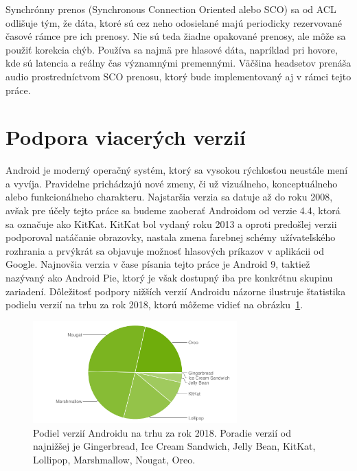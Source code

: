 Synchrónny prenos (Synchronous Connection Oriented alebo SCO) sa od ACL odlišuje tým, že dáta, ktoré sú cez neho odosielané majú periodicky rezervované časové rámce pre ich prenosy. Nie sú teda žiadne opakované prenosy, ale môže sa použiť korekcia chýb. Používa sa najmä pre hlasové dáta, napríklad pri hovore, kde sú latencia a reálny čas významnými premennými. Väčšina headsetov prenáša audio prostredníctvom SCO prenosu, ktorý bude implementovaný aj v rámci tejto práce.



\section{Podpora viacerých verzií}

Android je moderný operačný systém, ktorý sa vysokou rýchlosťou neustále mení a vyvíja. Pravidelne prichádzajú nové zmeny, či už vizuálneho, konceptuálneho alebo funkcionálneho charakteru. Najstaršia verzia sa datuje až do roku 2008, avšak pre účely tejto práce sa budeme zaoberať Androidom od verzie 4.4, ktorá sa označuje ako KitKat. KitKat bol vydaný roku 2013 a oproti predošlej verzii podporoval natáčanie obrazovky, nastala zmena farebnej schémy užívateľského rozhrania a prvýkrát sa objavuje možnosť hlasových príkazov v aplikácii od Google. Najnovšia verzia v čase písania tejto práce je Android 9, taktiež nazývaný ako Android Pie, ktorý je však dostupný iba pre konkrétnu skupinu zariadení. Dôležitosť podpory nižších verzií Androidu názorne ilustruje štatistika podielu verzií na trhu za rok 2018, ktorú môžeme vidieť na obrázku~\ref{market-share}.

\begin{figure}[hbt]
	\centering
	\includegraphics[width=0.7\textwidth]{obrazky-figures/market-share.png}
	\caption{Podiel verzií Androidu na trhu za rok 2018\protect\footnotemark. Poradie verzií od najnižšej je Gingerbread, Ice Cream Sandwich, Jelly Bean, KitKat, Lollipop, Marshmallow, Nougat, Oreo.}
	\label{market-share}
\end{figure}

